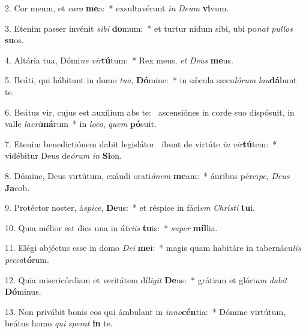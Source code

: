 2. Cor meum, et \textit{ca}\textit{ro} \textbf{me}a:~*  exsultavérunt \textit{in} \textit{De}\textit{um} \textbf{vi}vum.\

3. Etenim passer invénit \textit{si}\textit{bi} \textbf{do}mum:~*  et turtur nidum sibi, ubi po\textit{nat} \textit{pul}\textit{los} \textbf{su}os.\

4. Altária tua, Dómi\textit{ne} \textit{vir}\textbf{tú}tum:~*  Rex meus, \textit{et} \textit{De}\textit{us} \textbf{me}us.\

5. Beáti, qui hábitant in domo \textit{tu}\textit{a}, \textbf{Dó}mine:~*  in sǽcula sæcu\textit{ló}\textit{rum} \textit{lau}\textbf{dá}bunt te.\

6. Beátus vir, cujus est auxílium abs te: \dag\  ascensiónes in corde suo dispósuit, in valle \textit{la}\textit{cri}\textbf{má}rum~*  in \textit{lo}\textit{co}, \textit{quem} \textbf{pó}suit.\

7. Etenim benedictiónem dabit legislátor \dag\  ibunt de virtúte \textit{in} \textit{vir}\textbf{tú}tem:~*  vidébitur Deus de\textit{ó}\textit{rum} \textit{in} \textbf{Si}on.\

8. Dómine, Deus virtútum, exáudi orati\textit{ó}\textit{nem} \textbf{me}am:~*  áuribus pérci\textit{pe}, \textit{De}\textit{us} \textbf{Ja}cob.\

9. Protéctor noster, á\textit{spi}\textit{ce}, \textbf{De}us:~*  et réspice in fáci\textit{em} \textit{Chris}\textit{ti} \textbf{tu}i.\

10. Quia mélior est dies una in á\textit{tri}\textit{is} \textbf{tu}is:~*  \textit{su}\textit{per} \textbf{míl}lia.\

11. Elégi abjéctus esse in domo \textit{De}\textit{i} \textbf{me}i:~*  magis quam habitáre in tabernácu\textit{lis} \textit{pec}\textit{ca}\textbf{tó}rum.\

12. Quia misericórdiam et veritátem dí\textit{li}\textit{git} \textbf{De}us:~*  grátiam et glóri\textit{am} \textit{da}\textit{bit} \textbf{Dó}minus.\

13. Non privábit bonis eos qui ámbulant in \textit{in}\textit{no}\textbf{cén}tia:~*  Dómine virtútum, beátus homo \textit{qui} \textit{spe}\textit{rat} \textbf{in} te.\


